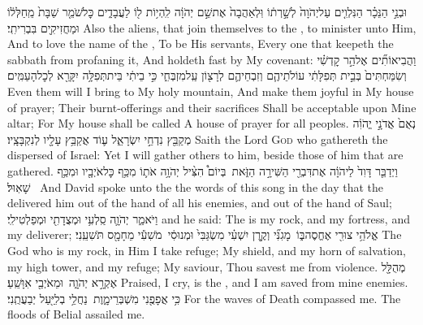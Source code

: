 {וּבְנֵ֣י הַנֵּכָ֗ר הַנִּלְוִ֤ים עַל\maqqaf יְהֹוָה֙ לְשָׁ֣רְת֔וֹ וּֽלְאַהֲבָה֙ אֶת\maqqaf שֵׁ֣ם יְהֹוָ֔ה לִֽהְי֥וֹת ל֖וֹ לַעֲבָדִ֑ים כׇּל\maqqaf שֹׁמֵ֤ר שַׁבָּת֙ מֵֽחַלְּל֔וֹ וּמַחֲזִיקִ֖ים בִּבְרִיתִֽי׃}
{Also the aliens, that join themselves to the \lord, to minister unto Him, And to love the name of the \lord, To be His servants, Every one that keepeth the sabbath from profaning it, And holdeth fast by My covenant:}
{וַהֲבִיאוֹתִ֞ים אֶל\maqqaf הַ֣ר קׇדְשִׁ֗י וְשִׂמַּחְתִּים֙ בְּבֵ֣ית תְּפִלָּתִ֔י עוֹלֹתֵיהֶ֧ם וְזִבְחֵיהֶ֛ם לְרָצ֖וֹן עַֽל\maqqaf מִזְבְּחִ֑י כִּ֣י בֵיתִ֔י בֵּית\maqqaf תְּפִלָּ֥ה יִקָּרֵ֖א לְכׇל\maqqaf הָעַמִּֽים׃}
{Even them will I bring to My holy mountain, And make them joyful in My house of prayer; Their burnt-offerings and their sacrifices Shall be acceptable upon Mine altar; For My house shall be called A house of prayer for all peoples.}
{נְאֻם֙ אֲדֹנָ֣י יֱהֹוִ֔ה מְקַבֵּ֖ץ נִדְחֵ֣י יִשְׂרָאֵ֑ל ע֛וֹד אֲקַבֵּ֥ץ עָלָ֖יו לְנִקְבָּצָֽיו׃}
{Saith the Lord \textsc{God} who gathereth the dispersed of Israel: Yet I will gather others to him, beside those of him that are gathered.}
\newperek
{}
\label{haft_53}
\setcounter{chap}{22}
\setcounter{verse}{1}
{וַיְדַבֵּ֤ר דָּוִד֙ לַיהֹוָ֔ה אֶת\maqqaf דִּבְרֵ֖י הַשִּׁירָ֣ה הַזֹּ֑את \setuma  בְּיוֹם֩ הִצִּ֨יל יְהֹוָ֥ה אֹת֛וֹ מִכַּ֥ף כׇּל\maqqaf אֹיְבָ֖יו וּמִכַּ֥ף שָׁאֽוּל׃ \setuma }
{And David spoke unto the \lord\space the words of this song in the day that the \lord\space delivered him out of the hand of all his enemies, and out of the hand of Saul;}
{וַיֹּאמַ֑ר יְהֹוָ֛ה סַֽלְעִ֥י וּמְצֻדָתִ֖י וּמְפַלְטִי\maqqaf לִֽי׃}
{and he said: The \lord\space is my rock, and my fortress, and my deliverer;}
{אֱלֹהֵ֥י צוּרִ֖י אֶחֱסֶה\maqqaf בּ֑וֹ \setuma  מָגִנִּ֞י וְקֶ֣רֶן יִשְׁעִ֗י מִשְׂגַּבִּי֙ וּמְנוּסִ֔י \setuma  מֹשִׁעִ֕י מֵחָמָ֖ס תֹּשִׁעֵֽנִי׃}
{The God who is my rock, in Him I take refuge; My shield, and my horn of salvation, my high tower, and my refuge; My saviour, Thou savest me from violence.}
{מְהֻלָּ֖ל אֶקְרָ֣א יְהֹוָ֑ה \setuma  וּמֵאֹיְבַ֖י אִוָּשֵֽׁעַ׃}
{Praised, I cry, is the \lord, and I am saved from mine enemies.}
{כִּ֥י אֲפָפֻ֖נִי מִשְׁבְּרֵי\maqqaf מָ֑וֶת \setuma  נַחֲלֵ֥י בְלִיַּ֖עַל יְבַעֲתֻֽנִי׃}
{For the waves of Death compassed me. The floods of Belial assailed me.}
